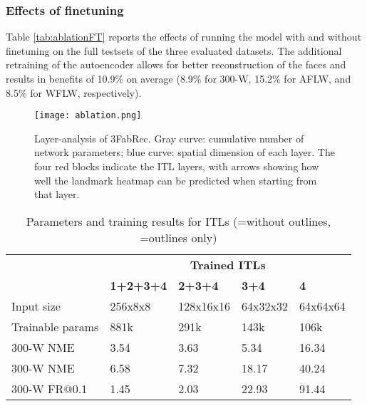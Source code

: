 \documentclass[10pt,twocolumn,letterpaper]{article}
\begin{document}
\vspace{-0.2cm}\subsubsection{Effects of finetuning}  
Table \ref{tab:ablationFT} reports the effects of running the model with and without finetuning on the full testsets of the three evaluated datasets. The additional retraining of the autoencoder allows for better reconstruction of the faces and results in benefits of 10.9\% on average (8.9\% for 300-W, 15.2\% for AFLW, and 8.5\% for WFLW, respectively).

\begin{figure}
	\begin{center}
		\texttt{[image: ablation.png]}
	\end{center}
	\vspace{-0.5cm}
	\caption{\small Layer-analysis of 3FabRec. Gray curve: cumulative number of network parameters; blue curve: spatial dimension of each layer. The four red blocks indicate the ITL layers, with arrows showing how well the landmark heatmap can be predicted when starting from that layer.}
	\label{fig:ablation}
	\vspace{-0.2cm}
\end{figure}

\begin{table}
	\footnotesize
	\begin{center}
		\begin{tabular}{l | p{1cm} | p{1.2cm} |p{1cm} | p{1cm} }
			
			\toprule
			&   \multicolumn{4}{c}{\bfseries  Trained ITLs} \\
& \bf 1+2+3+4  & \bf  2+3+4 &\bf  3+4  &  \bf 4 \\
			\toprule
Input size              & 256x8x8 & 128x16x16 & 64x32x32 & 64x64x64 \\
Trainable params  & 881k & 291k & 143k & 106k   \\
300-W NME    &    3.54 & 3.63 & 5.34 & 16.34         \\
			300-W NME     &       6.58 & 7.32  & 18.17 & 40.24       \\
			300-W FR@0.1    &  1.45      & 2.03  & 22.93 &  91.44            \\
\midrule
			\bottomrule
		\end{tabular}	
	\end{center}
	\vspace{-0.5cm}
	\caption{\small Parameters and training results for ITLs (=without outlines, =outlines only)}	
	\label{tab:ablationITL}
	\vspace{-0.1cm}
\end{table}
\end{document}
